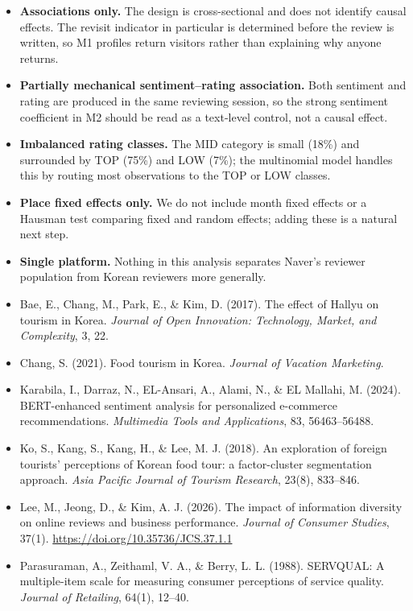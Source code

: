 \documentclass[10pt,a4paper]{article}
\newcommand{\subsect}[1]{\vspace{6pt}\noindent{\large\bfseries #1}\par\vspace{2pt}}
\begin{document}
\subsect{5.3 Limitations and Next Steps}
\begin{itemize}[leftmargin=14pt, itemsep=2pt]
  \item \textbf{Associations only.} The design is cross-sectional and
        does not identify causal effects. The revisit indicator in
        particular is determined before the review is written, so M1
        profiles return visitors rather than explaining why anyone
        returns.
  \item \textbf{Partially mechanical sentiment--rating association.}
        Both sentiment and rating are produced in the same reviewing
        session, so the strong sentiment coefficient in M2 should be
        read as a text-level control, not a causal effect.
  \item \textbf{Imbalanced rating classes.} The MID category is small
        (18\%) and surrounded by TOP (75\%) and LOW (7\%); the
        multinomial model handles this by routing most observations to
        the TOP or LOW classes.
  \item \textbf{Place fixed effects only.} We do not include month
        fixed effects or a Hausman test comparing fixed and random
        effects; adding these is a natural next step.
  \item \textbf{Single platform.} Nothing in this analysis separates
        Naver's reviewer population from Korean reviewers more generally.
\end{itemize}

\vspace{8pt}
\subsect{References}
\begin{itemize}[leftmargin=14pt, itemsep=3pt]
  \item Bae, E., Chang, M., Park, E., \& Kim, D. (2017). The effect of
        Hallyu on tourism in Korea. \textit{Journal of Open Innovation:
        Technology, Market, and Complexity}, 3, 22.
  \item Chang, S. (2021). Food tourism in Korea. \textit{Journal of
        Vacation Marketing}.
  \item Karabila, I., Darraz, N., EL-Ansari, A., Alami, N., \& EL
        Mallahi, M. (2024). BERT-enhanced sentiment analysis for
        personalized e-commerce recommendations. \textit{Multimedia
        Tools and Applications}, 83, 56463--56488.
  \item Ko, S., Kang, S., Kang, H., \& Lee, M. J. (2018). An exploration
        of foreign tourists' perceptions of Korean food tour: a
        factor-cluster segmentation approach. \textit{Asia Pacific
        Journal of Tourism Research}, 23(8), 833--846.
  \item Lee, M., Jeong, D., \& Kim, A. J. (2026). The impact of
        information diversity on online reviews and business
        performance. \textit{Journal of Consumer Studies}, 37(1).
        \url{https://doi.org/10.35736/JCS.37.1.1}
  \item Parasuraman, A., Zeithaml, V. A., \& Berry, L. L. (1988).
        SERVQUAL: A multiple-item scale for measuring consumer
        perceptions of service quality. \textit{Journal of Retailing},
        64(1), 12--40.
\end{itemize}
\end{document}

